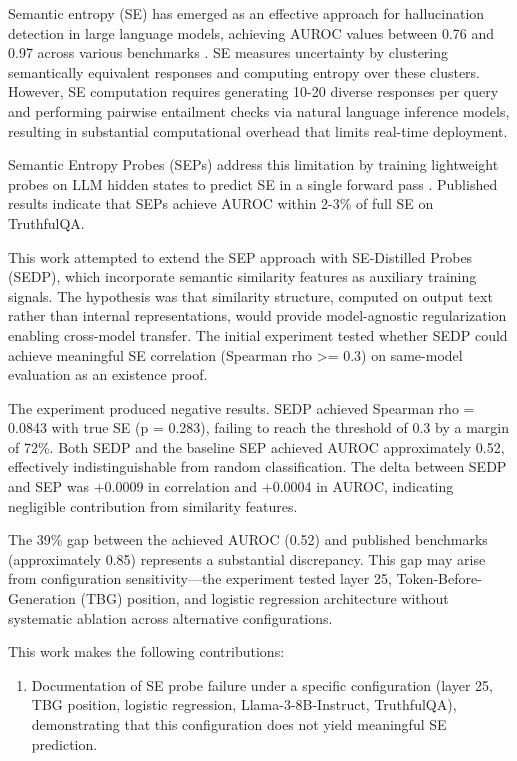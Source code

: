 
Semantic entropy (SE) has emerged as an effective approach for hallucination detection in large language models, achieving AUROC values between 0.76 and 0.97 across various benchmarks \citep{Farquhar2024Detecting}. SE measures uncertainty by clustering semantically equivalent responses and computing entropy over these clusters. However, SE computation requires generating 10-20 diverse responses per query and performing pairwise entailment checks via natural language inference models, resulting in substantial computational overhead that limits real-time deployment.

Semantic Entropy Probes (SEPs) address this limitation by training lightweight probes on LLM hidden states to predict SE in a single forward pass \citep{Kossen2024Semantic}. Published results indicate that SEPs achieve AUROC within 2-3\% of full SE on TruthfulQA.

This work attempted to extend the SEP approach with SE-Distilled Probes (SEDP), which incorporate semantic similarity features as auxiliary training signals. The hypothesis was that similarity structure, computed on output text rather than internal representations, would provide model-agnostic regularization enabling cross-model transfer. The initial experiment tested whether SEDP could achieve meaningful SE correlation (Spearman rho >= 0.3) on same-model evaluation as an existence proof.

The experiment produced negative results. SEDP achieved Spearman rho = 0.0843 with true SE (p = 0.283), failing to reach the threshold of 0.3 by a margin of 72\%. Both SEDP and the baseline SEP achieved AUROC approximately 0.52, effectively indistinguishable from random classification. The delta between SEDP and SEP was +0.0009 in correlation and +0.0004 in AUROC, indicating negligible contribution from similarity features.

The 39\% gap between the achieved AUROC (0.52) and published benchmarks (approximately 0.85) represents a substantial discrepancy. This gap may arise from configuration sensitivity---the experiment tested layer 25, Token-Before-Generation (TBG) position, and logistic regression architecture without systematic ablation across alternative configurations.

This work makes the following contributions:

\begin{enumerate}
\item Documentation of SE probe failure under a specific configuration (layer 25, TBG position, logistic regression, Llama-3-8B-Instruct, TruthfulQA), demonstrating that this configuration does not yield meaningful SE prediction.
\end{enumerate}

